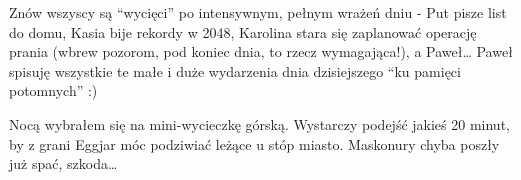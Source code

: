 
Znów wszyscy są “wycięci” po intensywnym, pełnym wrażeń dniu - Put pisze list do domu, Kasia bije rekordy w 2048, Karolina stara się zaplanować operację prania (wbrew pozorom, pod koniec dnia, to rzecz wymagająca!), a Paweł… Paweł spisuję wszystkie te małe i duże wydarzenia dnia dzisiejszego “ku pamięci potomnych” :)

Nocą wybrałem się na mini-wycieczkę górską. Wystarczy podejść jakieś 20 minut, by z grani Eggjar móc podziwiać leżące u stóp miasto. Maskonury chyba poszły już spać, szkoda…
